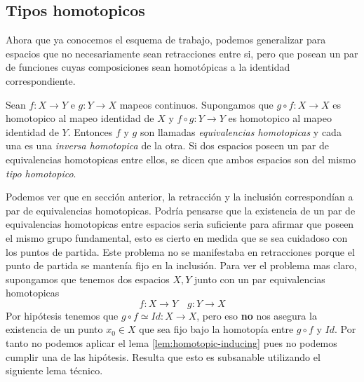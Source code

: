 \subsection{Tipos homotopicos}
Ahora que ya conocemos el esquema de trabajo, podemos generalizar para
espacios que no necesariamente sean retracciones entre si, pero que
posean un par de funciones cuyas composiciones sean homotópicas a la
identidad correspondiente.
\begin{definicion}
  Sean \(f : X \to Y\) e \(g : Y \to X\) mapeos continuos. Supongamos
  que \( g \circ f : X \to X \) es homotopico al mapeo identidad de
  \(X\) y \( f \circ g : Y \to Y \) es homotopico al mapeo identidad de
  \(Y\). Entonces \(f\) y \(g\) son llamadas \emph{equivalencias
  homotopicas} y cada una es una \emph{inversa homotopica} de la otra.
  Si dos espacios poseen un par de equivalencias homotopicas entre ellos,
  se dicen que ambos espacios son del mismo \emph{tipo homotopico}.
\end{definicion}
Podemos ver que en sección anterior, la retracción y la inclusión
correspondían a par de equivalencias homotopicas. Podría pensarse que la
existencia de un par de equivalencias homotopicas entre espacios seria
suficiente para afirmar que poseen el mismo grupo fundamental, esto es
cierto en medida que se sea cuidadoso con los puntos de partida. Este
problema no se manifestaba en retracciones porque el punto de partida se
mantenía fijo en la inclusión. Para ver el problema mas claro,
supongamos que tenemos dos espacios \(X, Y\) junto con un par
equivalencias homotopicas
\[ f : X \to Y \quad g : Y \to X \]
Por hipótesis tenemos que \(g \circ f \simeq Id : X \to X\), pero eso
\textbf{no} nos asegura la existencia de un punto \(x_0 \in X\) que sea
fijo bajo la homotopía entre \( g \circ f\) y \(Id\). Por tanto no
podemos aplicar el lema \ref{lem:homotopic-inducing} pues no podemos
cumplir una de las hipótesis. Resulta que esto es subsanable utilizando
el siguiente lema técnico.

